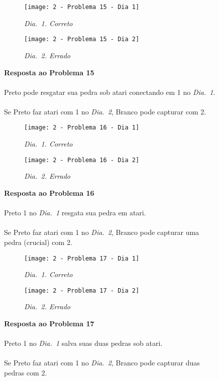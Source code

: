 \vfill

\begin{SCfigure}[][h!]
    \begin{subfigure}[t]{.31\textwidth}
        \texttt{[image: 2 - Problema 15 - Dia 1]}
        \caption*{\emph{Dia.\@~1. Correto}}
    \end{subfigure}
    \hfill
    \begin{subfigure}[t]{.31\textwidth}
        \texttt{[image: 2 - Problema 15 - Dia 2]}
        \caption*{\emph{Dia.\@~2. Errado}}
    \end{subfigure}
    \hfill
    \caption*{\textbf{Resposta ao Problema 15}\\\\Preto pode resgatar sua pedra sob atari conectando em 1 no \emph{Dia.\@~1}.\\\\Se Preto faz atari com 1 no \emph{Dia.\@~2}, Branco pode capturar com 2.}
\end{SCfigure}

\pagebreak

\begin{SCfigure}[][h!]
    \begin{subfigure}[t]{.31\textwidth}
        \texttt{[image: 2 - Problema 16 - Dia 1]}
        \caption*{\emph{Dia.\@~1. Correto}}
    \end{subfigure}
    \hfill
    \begin{subfigure}[t]{.31\textwidth}
        \texttt{[image: 2 - Problema 16 - Dia 2]}
        \caption*{\emph{Dia.\@~2. Errado}}
    \end{subfigure}
    \hfill
    \caption*{\textbf{Resposta ao Problema 16}\\\\Preto 1 no \emph{Dia.\@~1} resgata sua pedra em atari.\\\\Se Preto faz atari com 1 no \emph{Dia.\@~2}, Branco pode capturar uma pedra (crucial) com 2.}
\end{SCfigure}

\vfill

\begin{SCfigure}[][h!]
    \begin{subfigure}[t]{.31\textwidth}
        \texttt{[image: 2 - Problema 17 - Dia 1]}
        \caption*{\emph{Dia.\@~1. Correto}}
    \end{subfigure}
    \hfill
    \begin{subfigure}[t]{.31\textwidth}
        \texttt{[image: 2 - Problema 17 - Dia 2]}
        \caption*{\emph{Dia.\@~2. Errado}}
    \end{subfigure}
    \hfill
    \caption*{\textbf{Resposta ao Problema 17}\\\\Preto 1 no \emph{Dia.\@~1} salva suas duas pedras sob atari.\\\\Se Preto faz atari com 1 no \emph{Dia.\@~2}, Branco pode capturar duas pedras com 2.}
\end{SCfigure}

